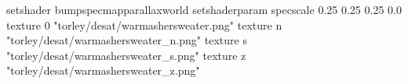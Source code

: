 setshader bumpspecmapparallaxworld
setshaderparam specscale 0.25 0.25 0.25 0.0
texture 0 "torley/desat/warmashersweater.png"
texture n "torley/desat/warmashersweater_n.png"
texture s "torley/desat/warmashersweater_s.png"
texture z "torley/desat/warmashersweater_z.png"

